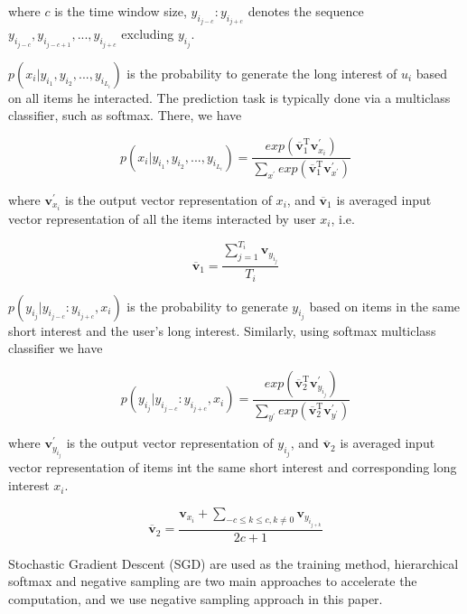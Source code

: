 \documentclass{sig-alternate-05-2015}
\begin{document}
where $c$ is the time window size, $y_{i_{j-c}} : y_{i_{j+c}}$ denotes the sequence
$y_{i_{j-c}}, y_{i_{j-c+1}}, ..., y_{i_{j+c}}$ excluding $y_{i_j}$.

$p(x_i | y_{i_1}, y_{i_2}, ..., y_{i_{L_i}})$ is the probability to generate
the long interest of $u_i$ based on all items he interacted.
The prediction task is typically done via a multiclass classifier,
such as softmax. There, we have

\begin{equation}
	p(x_i | y_{i_1}, y_{i_2}, ..., y_{i_{L_i}}) =
	\frac
	{
		exp ( \overline{\mathbf{v}}_{1}^{\mathrm{T}} \mathbf{v}_{x_i}^{'} )
	}
	{
		\sum_{x^{'}} exp ( \overline{\mathbf{v}}_{1}^{\mathrm{T}} \mathbf{v}_{x^{'}}^{'} )
	}
\end{equation}

where $\mathbf{v}_{x_i}^{'}$ is the output vector representation of $x_i$,
and $\overline{\mathbf{v}}_{1}$ is averaged input vector representation of all the items
interacted by user $x_i$, i.e.

\begin{equation}
	\overline{\mathbf{v}}_{1} = \frac{\sum_{j=1}^{T_i} \mathbf{v}_{y_{i_j}}}{T_i}
\end{equation}

$p(y_{i_j} | y_{i_{j-c}} : y_{i_{j+c}}, x_i)$
is the probability to generate $y_{i_j}$ based on items in the same short interest
and the user's long interest. Similarly, using softmax multiclass classifier we have

\begin{equation}
	p(y_{i_j} | y_{i_{j-c}} : y_{i_{j+c}}, x_i) =
	\frac
	{
		exp( \overline{\mathbf{v}}_{2}^{\mathrm{T}} \mathbf{v}_{y_{i_j}}^{'} )
	}
	{
		\sum_{y^{'}} exp( \overline{\mathbf{v}}_{2}^{\mathrm{T}} \mathbf{v}_{y^{'}}^{'} )
	}
\end{equation}

where $\mathbf{v}_{y_{i_j}}^{'}$ is the output vector representation of $y_{i_j}$,
and $\overline{\mathbf{v}}_{2}$ is averaged input vector representation of items
int the same short interest and corresponding long interest $x_i$.

\begin{equation}
	\overline{\mathbf{v}}_{2} = \frac{
    \mathbf{v}_{x_i} + 
    \sum_{-c \leq k \leq c, k \not= 0}{\mathbf{v}_{y_{i_{j+k}}}}
    }{2c+1}
\end{equation}

Stochastic Gradient Descent (SGD) are used as the training method,
hierarchical softmax and negative sampling are two main approaches to accelerate
the computation, and we use negative sampling approach in this paper.
\end{document}
